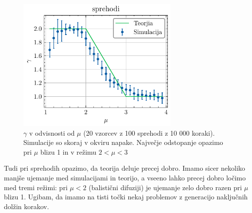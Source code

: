 \documentclass[slovene,11pt,a4paper]{article}
\begin{document}
\newpage
\begin{figure}[ht]
\begin{center}
  \includegraphics[width=8cm]{graphs/sprehodi.pdf}
  \caption{$\gamma$ v odvisnosti od $\mu$ (20 vzorcev z 100 sprehodi z 10 000 koraki). Simulacije so skoraj v okviru napake. Največje odstopanje opazimo pri $\mu$ blizu 1 in v režimu $2<\mu<3$}
  \label{fig: spre}
\end{center}
\end{figure}

Tudi pri sprehodih opazimo, da teorija deluje precej dobro. Imamo sicer nekoliko manjše ujemanje med simulacijami in teorijo, a vseeno lahko precej dobro ločimo med tremi režimi: pri $\mu<2$ (balistični difuziji) je ujemanje zelo dobro razen pri $\mu$ blizu 1. Ugibam, da imamo na tisti točki nekaj problemov z generacijo naključnih dolžin korakov.



\newpage


\end{document}
